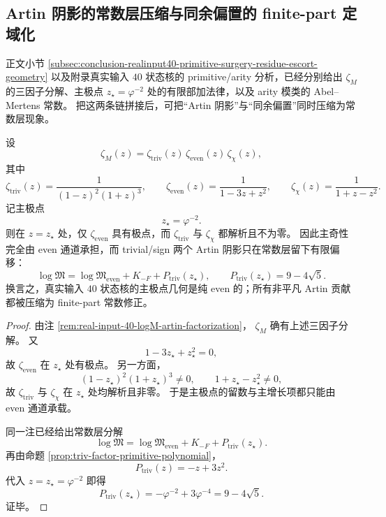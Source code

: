 \subsection{Artin 阴影的常数层压缩与同余偏置的 finite-part 定域化}

正文小节 \ref{subsec:conclusion-realinput40-primitive-surgery-residue-escort-geometry}
以及附录真实输入 \(40\) 状态核的 primitive/arity 分析，已经分别给出
\(\zeta_M\)
的三因子分解、主极点 \(z_\star=\varphi^{-2}\) 处的有限部加法律，以及 arity 模类的 Abel--Mertens 常数。
把这两条链拼接后，可把“Artin 阴影”与“同余偏置”同时压缩为常数层现象。

\begin{theorem}\label{thm:derived-artin-shadow-constant-layer-compression}
设
\[
\zeta_M(z)=\zeta_{\mathrm{triv}}(z)\,\zeta_{\mathrm{even}}(z)\,\zeta_{\chi}(z),
\]
其中
\[
\zeta_{\mathrm{triv}}(z)=\frac{1}{(1-z)^2(1+z)^3},
\qquad
\zeta_{\mathrm{even}}(z)=\frac{1}{1-3z+z^2},
\qquad
\zeta_{\chi}(z)=\frac{1}{1+z-z^2}.
\]
记主极点
\[
z_\star=\varphi^{-2}.
\]
则在 \(z=z_\star\) 处，仅 \(\zeta_{\mathrm{even}}\) 具有极点，而
\(
\zeta_{\mathrm{triv}}
\)
与
\(
\zeta_\chi
\)
都解析且不为零。
因此主奇性完全由 even 通道承担，而 trivial/sign 两个 Artin 阴影只在常数层留下有限偏移：
\[
\log\mathfrak{M}
=
\log\mathfrak{M}_{\mathrm{even}}
+K_{-F}
+P_{\mathrm{triv}}(z_\star),
\qquad
P_{\mathrm{triv}}(z_\star)=9-4\sqrt5.
\]
换言之，真实输入 \(40\) 状态核的主极点几何是纯 even 的；所有非平凡 Artin 贡献都被压缩为 finite-part 常数修正。
\end{theorem}

\begin{proof}
由注 \ref{rem:real-input-40-logM-artin-factorization}，
\(
\zeta_M
\)
确有上述三因子分解。
又
\[
1-3z_\star+z_\star^2=0,
\]
故 \(\zeta_{\mathrm{even}}\) 在 \(z_\star\) 处有极点。
另一方面，
\[
(1-z_\star)^2(1+z_\star)^3\neq 0,
\qquad
1+z_\star-z_\star^2\neq 0,
\]
故 \(\zeta_{\mathrm{triv}}\) 与 \(\zeta_\chi\) 在 \(z_\star\) 处均解析且非零。
于是主极点的留数与主增长项都只能由 even 通道承载。

同一注已经给出常数层分解
\[
\log\mathfrak{M}
=
\log\mathfrak{M}_{\mathrm{even}}+K_{-F}+P_{\mathrm{triv}}(z_\star).
\]
再由命题 \ref{prop:triv-factor-primitive-polynomial}，
\[
P_{\mathrm{triv}}(z)=-z+3z^2.
\]
代入 \(z=z_\star=\varphi^{-2}\) 即得
\[
P_{\mathrm{triv}}(z_\star)
=
-\varphi^{-2}+3\varphi^{-4}
=
9-4\sqrt5.
\]
证毕。
\end{proof}

